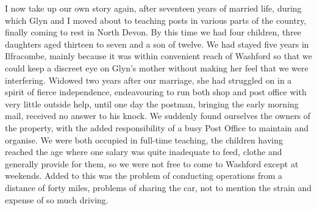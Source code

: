 
I now take up our own story again, after seventeen years of married life, during which Glyn and I moved about to teaching posts in various parts of the country, finally coming to rest in North Devon. By this time we had four children, three daughters aged thirteen to seven and a son of twelve. We had stayed five years in Ilfracombe, mainly because it was within convenient reach of Washford so that we could keep a discreet eye on Glyn's mother without making her feel that we were interfering. Widowed two years after our marriage, she had struggled on in a spirit of fierce independence, endeavouring to run both shop and post office with very little outside help, until one day the postman, bringing the early morning mail, received no answer to his knock. We suddenly found ourselves the owners of the property, with the added responsibility of a busy Post Office to maintain and organise. We were both occupied in full-time teaching, the children having reached the age where one salary was quite inadequate to feed, clothe and generally provide for them, so we were not free to come to Washford except at weekends. Added to this was the problem of conducting operations from a distance of forty miles, problems of sharing the car, not to mention the strain and expense of so much driving.

